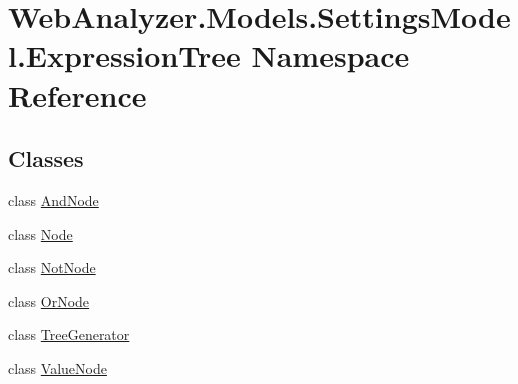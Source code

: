 \hypertarget{namespace_web_analyzer_1_1_models_1_1_settings_model_1_1_expression_tree}{}\section{Web\+Analyzer.\+Models.\+Settings\+Model.\+Expression\+Tree Namespace Reference}
\label{namespace_web_analyzer_1_1_models_1_1_settings_model_1_1_expression_tree}
\subsection*{Classes}
\begin{DoxyCompactItemize}
\item 
class \hyperlink{class_web_analyzer_1_1_models_1_1_settings_model_1_1_expression_tree_1_1_and_node}{And\+Node}
\item 
class \hyperlink{class_web_analyzer_1_1_models_1_1_settings_model_1_1_expression_tree_1_1_node}{Node}
\item 
class \hyperlink{class_web_analyzer_1_1_models_1_1_settings_model_1_1_expression_tree_1_1_not_node}{Not\+Node}
\item 
class \hyperlink{class_web_analyzer_1_1_models_1_1_settings_model_1_1_expression_tree_1_1_or_node}{Or\+Node}
\item 
class \hyperlink{class_web_analyzer_1_1_models_1_1_settings_model_1_1_expression_tree_1_1_tree_generator}{Tree\+Generator}
\item 
class \hyperlink{class_web_analyzer_1_1_models_1_1_settings_model_1_1_expression_tree_1_1_value_node}{Value\+Node}
\end{DoxyCompactItemize}
